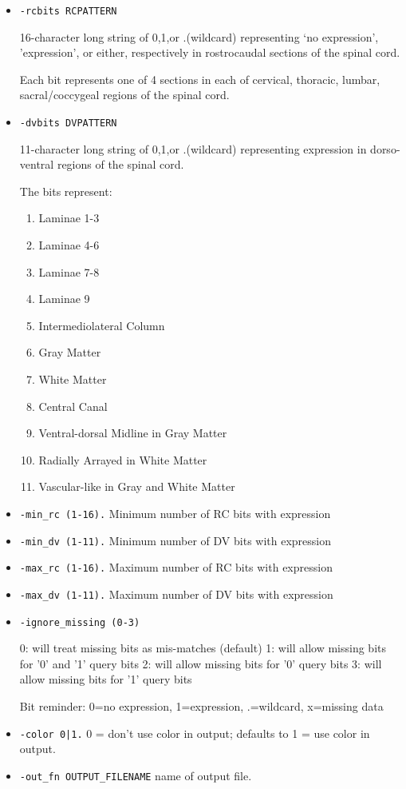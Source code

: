 \documentclass[10pt]{article}
\begin{document}
\begin{itemize}
\item {\tt -rcbits RCPATTERN}

16-character long string of 0,1,or .(wildcard) representing `no expression', 'expression', or either, respectively in rostrocaudal sections of the spinal cord.

Each bit represents one of 4 sections in each of cervical, thoracic, lumbar, sacral/coccygeal regions of the spinal cord.

\item {\tt -dvbits DVPATTERN}

11-character long string of 0,1,or .(wildcard) representing expression in dorso-ventral regions of the spinal cord.

The bits represent:
\begin{enumerate}
\item Laminae 1-3
\item Laminae 4-6
\item Laminae 7-8
\item Laminae 9
\item Intermediolateral Column
\item Gray Matter
\item White Matter
\item Central Canal
\item Ventral-dorsal Midline in Gray Matter
\item Radially Arrayed in White Matter
\item Vascular-like in Gray and White Matter
\end{enumerate}


\item {\tt -min\_rc (1-16).}
Minimum number of RC bits with expression

\item {\tt -min\_dv (1-11).}
Minimum number of DV bits with expression

\item {\tt -max\_rc (1-16).}
Maximum number of RC bits with expression

\item{\tt -max\_dv (1-11).}
Maximum number of DV bits with expression

\item{\tt -ignore\_missing (0-3)}

0: will treat missing bits as mis-matches (default)
1: will allow missing bits for '0' and '1' query bits
2: will allow missing bits for '0' query bits
3: will allow missing bits for '1' query bits

Bit reminder: 0=no expression, 1=expression, .=wildcard, x=missing data

\item {\tt -color 0|1.}
0 = don't use color in output; defaults to 1 = use color in output.

\item {\tt -out\_fn OUTPUT\_FILENAME}
name of output file.

\end{itemize}
\end{document}
